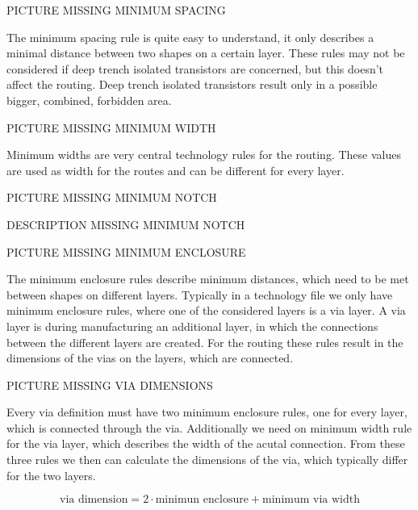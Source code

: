 PICTURE MISSING MINIMUM SPACING

The minimum spacing rule is quite easy to understand, it only describes a minimal distance between two shapes on a certain layer. These rules may not be considered if deep trench isolated transistors are concerned, but this doesn't affect the routing. Deep trench isolated transistors result only in a possible bigger, combined, forbidden area.

PICTURE MISSING MINIMUM WIDTH

Minimum widths are very central technology rules for the routing. These values are used as width for the routes and can be different for every layer.

PICTURE MISSING MINIMUM NOTCH

DESCRIPTION MISSING MINIMUM NOTCH

PICTURE MISSING MINIMUM ENCLOSURE

The minimum enclosure rules describe minimum distances, which need to be met between shapes on different layers. Typically in a technology file we only have minimum enclosure rules, where one of the considered layers is a via layer. A via layer is during manufacturing an additional layer, in which the connections between the different layers are created. For the routing these rules result in the dimensions of the vias on the layers, which are connected.

PICTURE MISSING VIA DIMENSIONS

Every via definition must have two minimum enclosure rules, one for every layer, which is connected through the via. Additionally we need on minimum width rule for the via layer, which describes the width of the acutal connection. From these three rules we then can calculate the dimensions of the via, which typically differ for the two layers.

\[\text{via dimension} = 2 \cdot \text{minimun enclosure} + \text{minimum via width}\]